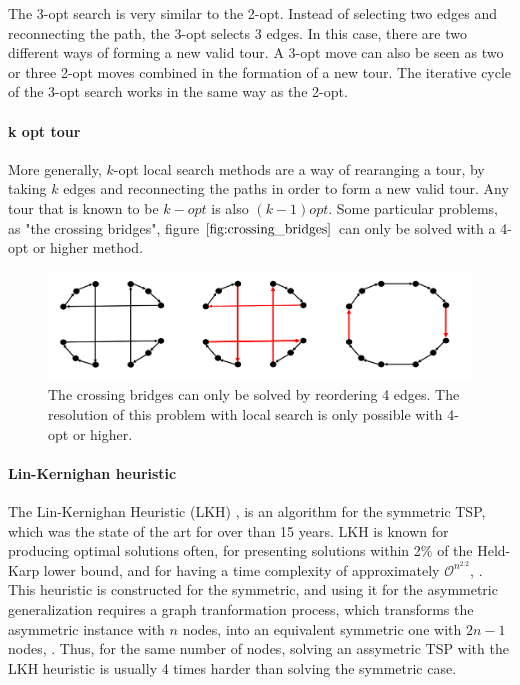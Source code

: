 The 3-opt search is very similar to the 2-opt. Instead of selecting
two edges and reconnecting the path, the 3-opt selects 3 edges. In this case,
there are two different ways of forming a new valid tour. A 3-opt move
can also be seen as two or three 2-opt moves combined in the formation of a
new tour. The iterative cycle of the 3-opt search works in the same way as
the 2-opt.






\paragraph{k opt tour}
More generally, $k$-opt local search methods are a way of rearanging a tour,
by taking $k$ edges and reconnecting the paths in order to form a new valid tour.
Any tour that is known to be $k-opt$ is also $(k-1)opt$. Some particular problems,
as "the crossing bridges", figure $\ref{fig:crossing_bridges}$ can only be solved with a 4-opt or higher method.

\begin{figure}[htbp]
  \includegraphics[scale=0.3]{./Figures/tsp/crossing_bridges}
  \caption{The crossing bridges can only be solved by reordering 4 edges.
  The resolution of this problem with local search is only possible
  with 4-opt or higher.}
  \label{fig:crossing_bridges}
\end{figure}


\paragraph{Lin-Kernighan heuristic}

The Lin-Kernighan Heuristic (LKH) \cite{lkh_original}, is an algorithm for the symmetric TSP, 
which was the state of the art for over than 15 years.
LKH is known for producing optimal solutions often, for presenting solutions within 2$\%$ of the Held-Karp lower bound, 
and for having a time complexity of approximately $\mathcal{O}^{n^{2.2}}$, \cite{heuristics_tsp}.
This heuristic is constructed for the symmetric, and using it for the asymmetric generalization requires a 
graph tranformation process, which transforms the asymmetric instance with $n$ nodes, into an equivalent symmetric one with $2n-1$ nodes, \cite{atsp_to_tsp_1} \cite{atsp_to_tsp_2}.
Thus, for the same number of nodes, solving an assymetric TSP with the LKH heuristic is usually 4 times harder than solving the symmetric case.

